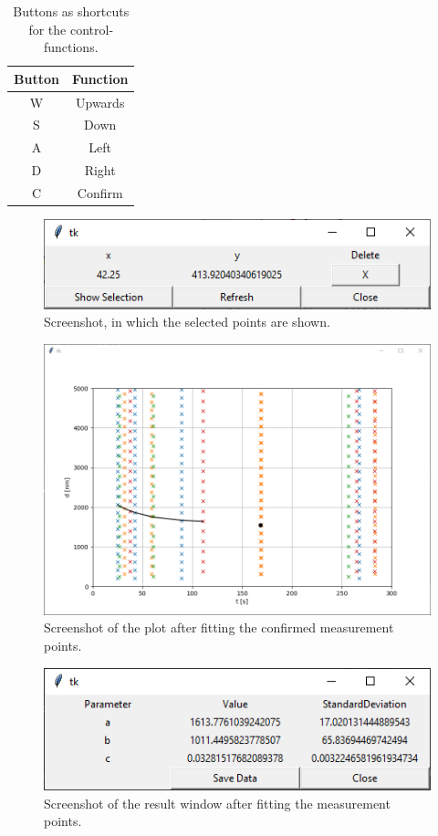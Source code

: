 \begin{table}
	\centering
	\caption{Buttons as shortcuts for the control-functions.}
	\label{tab:shortcuts}
	\begin{tabular}{|c|c|}
		\hline
		Button & Function \\
		\hline
		W & Upwards \\
		\hline
		S & Down \\
		\hline
		A & Left \\
		\hline
		D & Right \\
		\hline
		C & Confirm \\
		\hline
	\end{tabular}
\end{table}

\begin{figure}
	\centering
	\includegraphics[width=0.7\linewidth]{LamellaDevice_Evaluation/Evaluation_Selection}
	\caption{Screenshot, in which the selected points are shown.}
	\label{fig:evaluation_selection}
\end{figure}

\begin{figure}
	\centering
	\includegraphics[width=0.7\linewidth]{LamellaDevice_Evaluation/Evaluation_Fitted}
	\caption{Screenshot of the plot after fitting the confirmed measurement points. }
	\label{fig:evaluation_fitted}
\end{figure}

\begin{figure}
	\centering
	\includegraphics[width=0.7\linewidth]{LamellaDevice_Evaluation/Evaluation_Results}
	\caption{Screenshot of the result window after fitting the measurement points.}
	\label{fig:evaluation_results}
\end{figure}
